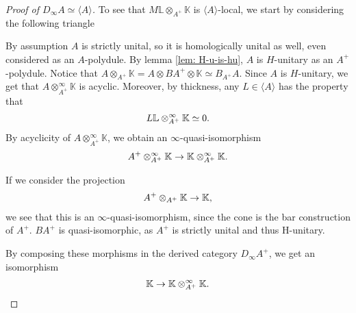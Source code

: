 \documentclass[../thesis.tex]{subfiles}
\begin{document}
\begin{proof}[Proof of $D_\infty A \simeq \langle A \rangle$]
                To see that $M \mathbb{L}\otimes_{A^+} \mathbb{K}$ is $\langle A \rangle$-local, we start by considering the following triangle
                \begin{center}
                \end{center}
                By assumption $A$ is strictly unital, so it is homologically unital as well, even considered as an $A$-polydule. By lemma \ref{lem: H-u-is-hu}, $A$ is $H$-unitary as an $A^+$-polydule. Notice that $A \otimes_{A^+} \mathbb{K} = A \otimes BA^+ \otimes \mathbb{K} \simeq B_{A^+}A$. Since $A$ is $H$-unitary, we get that $A \otimes_{A^+}^\infty \mathbb{K}$ is acyclic. Moreover, by thickness, any $L\in \langle A \rangle$ has the property that
                \begin{align*}
                    L \mathbb{L}\otimes_{A^+}^\infty \mathbb{K} \simeq 0\tt{.}
                \end{align*}
                By acyclicity of $A \otimes_{A^+}^\infty \mathbb{K}$, we obtain an $\infty$-quasi-isomorphism
                \begin{align}
                    A^+ \otimes_{A^+}^\infty \mathbb{K} \rightarrow \mathbb{K} \otimes_{A^+}^\infty \mathbb{K}\tt{.}
                \end{align}

                If we consider the projection
                \begin{align*}
                    A^+ \otimes_{A^+}\mathbb{K} \rightarrow \mathbb{K}\tt{,}
                \end{align*}
                we see that this is an $\infty$-quasi-isomorphism, since the cone is the bar construction of $A^+$. $BA^+$ is quasi-isomorphic, as $A^+$ is strictly unital and thus H-unitary.

                By composing these morphisms in the derived category $D_\infty A^+$, we get an isomorphism
                \begin{align}
                    \mathbb{K} \rightarrow \mathbb{K} \otimes_{A^+}^\infty \mathbb{K}\tt{.}
                \end{align}


\end{proof}
\end{document}

